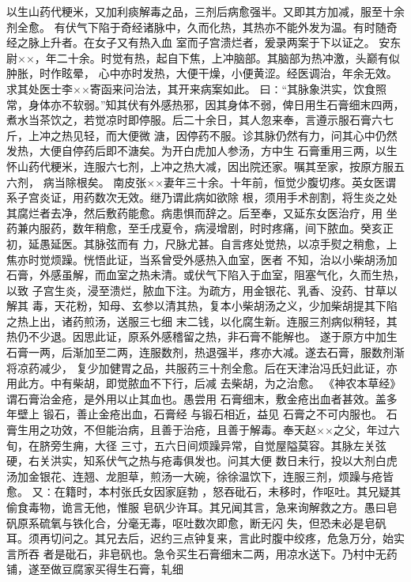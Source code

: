 \documentclass[a4paper,12pt,UTF8,twoside]{ctexbook}
\begin{document}
以生山药代粳米，又加利痰解毒之品，三剂后病愈强半。又即其方加减，服至十余剂全愈。 
有伏气下陷于奇经诸脉中，久而化热，其热亦不能外发为温。有时随奇经之脉上升者。在女子又有热入血 
室而子宫溃烂者，爰录两案于下以证之。 
安东尉××，年二十余。时觉有热，起自下焦，上冲脑部。其脑部为热冲激，头巅有似肿胀，时作眩晕， 
心中亦时发热，大便干燥，小便黄涩。经医调治，年余无效。求其处医士李××寄函来问治法，其开来病案如此。 
曰∶“其脉象洪实，饮食照常，身体亦不软弱。”知其伏有外感热邪，因其身体不弱，俾日用生石膏细末四两， 
煮水当茶饮之，若觉凉时即停服。后二十余日，其人忽来奉，言遵示服石膏六七斤，上冲之热见轻，而大便微 
溏，因停药不服。诊其脉仍然有力，问其心中仍然发热，大便自停药后即不溏矣。为开白虎加人参汤，方中生 
石膏重用三两，以生怀山药代粳米，连服六七剂，上冲之热大减，因出院还家。嘱其至家，按原方服五六剂， 
病当除根矣。 
南皮张××妻年三十余。十年前，恒觉少腹切疼。英女医谓系子宫炎证，用药数次无效。继乃谓此病如欲除 
根，须用手术剖割，将生炎之处其腐烂者去净，然后敷药能愈。病患惧而辞之。后至奉，又延东女医治疗，用 
坐药兼内服药，数年稍愈，至壬戌夏令，病浸增剧，时时疼痛，间下脓血。癸亥正初，延愚延医。其脉弦而有 
力，尺脉尤甚。自言疼处觉热，以凉手熨之稍愈，上焦亦时觉烦躁。恍悟此证，当系曾受外感热入血室，医者 
不知，治以小柴胡汤加石膏，外感虽解，而血室之热未清。或伏气下陷入于血室，阻塞气化，久而生热，以致 
子宫生炎，浸至溃烂，脓血下注。为疏方，用金银花、乳香、没药、甘草以解其 
毒，天花粉，知母、玄参以清其热，复本小柴胡汤之义，少加柴胡提其下陷之热上出，诸药煎汤，送服三七细 
末二钱，以化腐生新。连服三剂病似稍轻，其热仍不少退。因思此证，原系外感稽留之热，非石膏不能解也。 
遂于原方中加生石膏一两，后渐加至二两，连服数剂，热退强半，疼亦大减。遂去石膏，服数剂渐将凉药减少， 
复少加健胃之品，共服药三十剂全愈。后在天津治冯氏妇此证，亦用此方。中有柴胡，即觉脓血不下行，后减 
去柴胡，为之治愈。 
《神农本草经》谓石膏治金疮，是外用以止其血也。愚尝用 石膏细末，敷金疮出血者甚效。盖多年壁上 
锻石，善止金疮出血，石膏经 与锻石相近，益见 石膏之不可内服也。 
石膏生用之功效，不但能治病，且善于治疮，且善于解毒。奉天赵××之父，年过六旬，在脐旁生痈，大径 
三寸，五六日间烦躁异常，自觉屋隘莫容。其脉左关弦硬，右关洪实，知系伏气之热与疮毒俱发也。问其大便 
数日未行，投以大剂白虎汤加金银花、连翘、龙胆草，煎汤一大碗，徐徐温饮下，连服三剂，烦躁与疮皆愈。 
又∶在籍时，本村张氏女因家庭勃 ，怒吞砒石，未移时，作呕吐。其兄疑其偷食毒物，诡言无他，惟服 
皂矾少许耳。其兄闻其言，急来询解救之方。愚曰皂矾原系硫氧与铁化合，分毫无毒，呕吐数次即愈，断无闪 
失，但恐未必是皂矾耳。须再切问之。其兄去后，迟约三点钟复来，言此时腹中绞疼，危急万分，始实言所吞 
者是砒石，非皂矾也。急令买生石膏细末二两，用凉水送下。乃村中无药铺，遂至做豆腐家买得生石膏，轧细 
\end{document}
